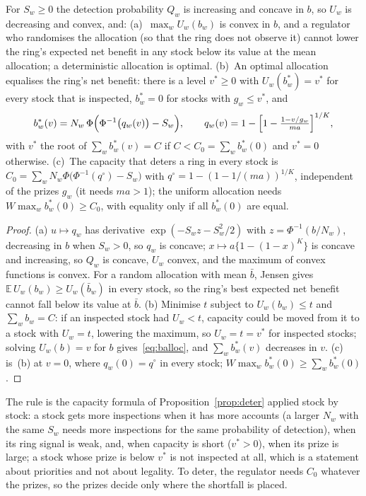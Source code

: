 \begin{proposition}\label{prop:alloc}
For $S_w\ge0$ the detection probability $Q_w$ is increasing and concave in $b$, so $U_w$ is decreasing and convex, and: (a)~$\max_wU_w(b_w)$ is convex in $b$, and a regulator who randomises the allocation (so that the ring does not observe it) cannot lower the ring's expected net benefit in any stock below its value at the mean allocation; a deterministic allocation is optimal. (b)~An optimal allocation equalises the ring's net benefit: there is a level $v^\ast\ge0$ with $U_w(b_w^\ast)=v^\ast$ for every stock that is inspected, $b_w^\ast=0$ for stocks with $g_w\le v^\ast$, and
\begin{equation}
b_w^\ast(v)=N_w\,\Phi\Bigl(\Phi^{-1}\bigl(q_w(v)\bigr)-S_w\Bigr),\qquad q_w(v)=1-\Bigl[1-\tfrac{1-v/g_w}{ma}\Bigr]^{1/K},
\label{eq:balloc}
\end{equation}
with $v^\ast$ the root of $\sum_wb_w^\ast(v)=C$ if $C<C_0=\sum_wb_w^\ast(0)$ and $v^\ast=0$ otherwise. (c)~The capacity that deters a ring in every stock is $C_0=\sum_wN_w\Phi\bigl(\Phi^{-1}(q^\circ)-S_w\bigr)$ with $q^\circ=1-(1-1/(ma))^{1/K}$, independent of the prizes $g_w$ (it needs $ma>1$); the uniform allocation needs $W\max_wb_w^\ast(0)\ge C_0$, with equality only if all $b_w^\ast(0)$ are equal.
\end{proposition}
\begin{proof}
(a) $u\mapsto q_w$ has derivative $\exp(-S_wz-S_w^2/2)$ with $z=\Phi^{-1}(b/N_w)$, decreasing in $b$ when $S_w>0$, so $q_w$ is concave; $x\mapsto a\{1-(1-x)^K\}$ is concave and increasing, so $Q_w$ is concave, $U_w$ convex, and the maximum of convex functions is convex. For a random allocation with mean $\bar b$, Jensen gives $\mathbb E\,U_w(b_w)\ge U_w(\bar b_w)$ in every stock, so the ring's best expected net benefit cannot fall below its value at $\bar b$. (b) Minimise $t$ subject to $U_w(b_w)\le t$ and $\sum_wb_w=C$: if an inspected stock had $U_w<t$, capacity could be moved from it to a stock with $U_w=t$, lowering the maximum, so $U_w=t=v^\ast$ for inspected stocks; solving $U_w(b)=v$ for $b$ gives~\eqref{eq:balloc}, and $\sum_wb_w^\ast(v)$ decreases in $v$. (c) is~(b) at $v=0$, where $q_w(0)=q^\circ$ in every stock; $W\max_wb_w^\ast(0)\ge\sum_wb_w^\ast(0)$. \qedhere
\end{proof}

The rule is the capacity formula of Proposition~\ref{prop:deter} applied stock by stock: a stock gets more inspections when it has more accounts (a larger $N_w$ with the same $S_w$ needs more inspections for the same probability of detection), when its ring signal is weak, and, when capacity is short ($v^\ast>0$), when its prize is large; a stock whose prize is below $v^\ast$ is not inspected at all, which is a statement about priorities and not about legality. To deter, the regulator needs $C_0$ whatever the prizes, so the prizes decide only where the shortfall is placed.


